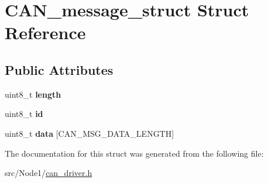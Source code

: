\hypertarget{structCAN__message__struct}{}\section{C\+A\+N\+\_\+message\+\_\+struct Struct Reference}
\label{structCAN__message__struct}
\subsection*{Public Attributes}
\begin{DoxyCompactItemize}
\item 
uint8\+\_\+t {\bfseries length}\hypertarget{structCAN__message__struct_a95d566e4c3d1ef1b1eb1351c7b0bf600}{}\label{structCAN__message__struct_a95d566e4c3d1ef1b1eb1351c7b0bf600}

\item 
uint8\+\_\+t {\bfseries id}\hypertarget{structCAN__message__struct_ad3db4d9d3d38f4ba315d6f4f5df8ad5d}{}\label{structCAN__message__struct_ad3db4d9d3d38f4ba315d6f4f5df8ad5d}

\item 
uint8\+\_\+t {\bfseries data} \mbox{[}C\+A\+N\+\_\+\+M\+S\+G\+\_\+\+D\+A\+T\+A\+\_\+\+L\+E\+N\+G\+TH\mbox{]}\hypertarget{structCAN__message__struct_ad0537716d44470ed1e1c62d982c7ea2a}{}\label{structCAN__message__struct_ad0537716d44470ed1e1c62d982c7ea2a}

\end{DoxyCompactItemize}


The documentation for this struct was generated from the following file\+:\begin{DoxyCompactItemize}
\item 
src/\+Node1/\hyperlink{Node1_2can__driver_8h}{can\+\_\+driver.\+h}\end{DoxyCompactItemize}
